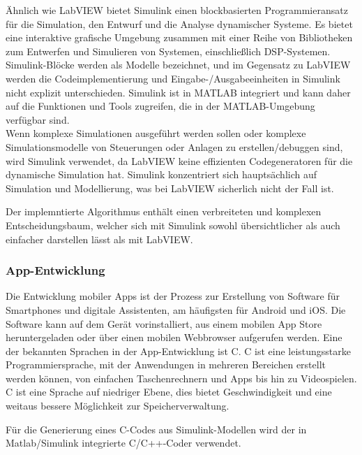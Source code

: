 Ähnlich wie LabVIEW bietet Simulink einen blockbasierten Programmieransatz für die Simulation, den Entwurf und die Analyse dynamischer Systeme. Es bietet eine interaktive grafische Umgebung zusammen mit einer Reihe von Bibliotheken zum Entwerfen und Simulieren von Systemen, einschließlich DSP-Systemen. Simulink-Blöcke werden als Modelle bezeichnet, und im Gegensatz zu LabVIEW werden die Codeimplementierung und Eingabe-/Ausgabeeinheiten in Simulink nicht explizit unterschieden. Simulink ist in MATLAB integriert und kann daher auf die Funktionen und Tools zugreifen, die in der MATLAB-Umgebung verfügbar sind. \cite{Kehtarnavaz2006} \cite{Cansalar2015}\\


Wenn komplexe Simulationen ausgeführt werden sollen oder komplexe Simulationsmodelle von Steuerungen oder Anlagen zu erstellen/debuggen sind, wird Simulink verwendet, da LabVIEW keine effizienten Codegeneratoren für die dynamische Simulation hat.
Simulink konzentriert sich hauptsächlich auf Simulation und Modellierung, was bei LabVIEW sicherlich nicht der Fall ist.

Der implemntierte Algorithmus enthält einen verbreiteten und komplexen Entscheidungsbaum, welcher sich mit Simulink sowohl übersichtlicher als auch einfacher darstellen lässt als mit LabVIEW.



\subsubsection{App-Entwicklung}
Die Entwicklung mobiler Apps ist der Prozess zur Erstellung von Software für Smartphones und digitale Assistenten, am häufigsten für Android und iOS. Die Software kann auf dem Gerät vorinstalliert, aus einem mobilen App Store heruntergeladen oder über einen mobilen Webbrowser aufgerufen werden. Eine der bekannten Sprachen in der App-Entwicklung ist C.
C ist eine leistungsstarke Programmiersprache, mit der Anwendungen in mehreren Bereichen erstellt werden können, von einfachen Taschenrechnern und Apps bis hin zu Videospielen. C ist eine Sprache auf niedriger Ebene, dies bietet Geschwindigkeit und eine weitaus bessere Möglichkeit zur Speicherverwaltung.

Für die Generierung eines C-Codes aus Simulink-Modellen wird der in Matlab/Simulink integrierte C/C++-Coder verwendet.

